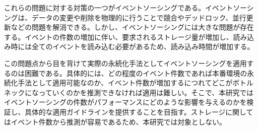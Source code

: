 \documentclass[../../main]{subfiles}
\begin{document}
    これらの問題に対する対策の一つがイベントソーシングである。イベントソーシングは、データの変更や削除を物理的に行うことで競合やデッドロック、並行更新などの問題を解消できる。しかし、イベントソーシングには大きな問題が存在する。イベントの件数の増加に伴い、要求されるストレージ量が増加し、読み込み時には全てのイベントを読み込む必要があるため、読み込み時間が増加する。

    この問題点から目を背けて実際の永続化手法としてイベントソーシングを適用するのは困難である。具体的には、どの程度のイベント件数であれば本番環境の永続化手法として適用可能なのか、イベント件数が増加するにつれてどこがボトルネックになっていくのかを推測できなければ適用は難しい。そこで、本研究ではイベントソーシングの件数がパフォーマンスにどのような影響を与えるのかを検証し、具体的な適用ガイドラインを提供することを目指す。ストレージに関してはイベント件数から推測が容易であるため、本研究では対象としない。
    \clearpage
\end{document}
